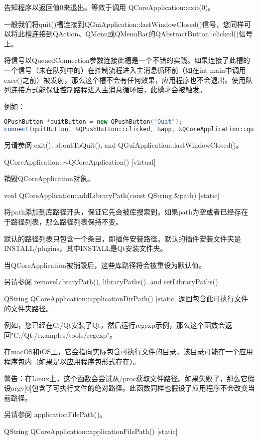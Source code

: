 告知程序以返回值0来退出。等效于调用 QCoreApplication::exit(0)。

一般我们将quit()槽连接到QGuiApplication::lastWindowClosed()信号，您同样可以将此槽连接到QAction、QMenu或QMenuBar的QAbstractButton::clicked()信号上。

将信号以QueuedConnection参数连接此槽是一个不错的实践。如果连接了此槽的一个信号（未在队列中的）在控制流程进入主消息循环前（如在int main中调用exec()之前）被发射，那么这个槽不会有任何效果，应用程序也不会退出。使用队列连接方式能保证控制路程进入主消息循环后，此槽才会被触发。

例如：


\begin{lstlisting}[language=C++]
QPushButton *quitButton = new QPushButton("Quit");
connect(quitButton, &QPushButton::clicked, &app, &QCoreApplication::quit, Qt::QueuedConnection);
\end{lstlisting}

另请参阅 exit(), aboutToQuit(), and QGuiApplication::lastWindowClosed()。

QCoreApplication::$\sim$QCoreApplication() [virtual]

销毁QCoreApplication对象。

void QCoreApplication::addLibraryPath(const QString \&path) [static]

将path添加到库路径开头，保证它先会被库搜索到。如果path为空或者已经存在于路径列表，那么路径列表保持不变。

默认的路径列表只包含一个条目，即插件安装路径。默认的插件安装文件夹是INSTALL/plugins，其中INSTALL是Qt安装文件夹。

当QCoreApplication被销毁后，这些库路径将会被重设为默认值。

另请参阅 removeLibraryPath(), libraryPaths(), and setLibraryPaths().

QString QCoreApplication::applicationDirPath() [static]
返回包含此可执行文件的文件夹路径。

例如，您已经在C:/Qt安装了Qt，然后运行regexp示例，那么这个函数会返回"C:/Qt:/examples/tools/regexp"。

在macOS和iOS上，它会指向实际包含可执行文件的目录，该目录可能在一个应用程序包内（如果是以应用程序包形式存在）。

警告：在Linux上，这个函数会尝试从/proc获取文件路径。如果失败了，那么它假设argv[0]包含了可执行文件的绝对路径。此函数同样也假设了应用程序不会改变当前路径。

另请参阅 applicationFilePath()。

QString QCoreApplication::applicationFilePath() [static]

